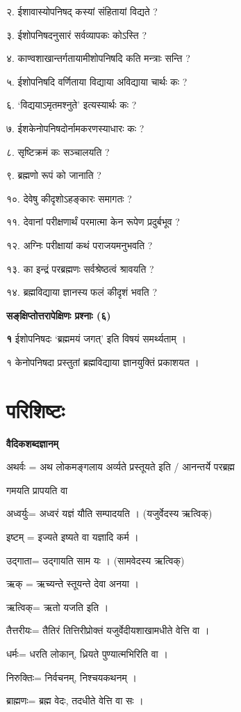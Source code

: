 \documentclass[11pt, a5paper]{article}
\begin{document}
२. ईशावास्योपनिषद् कस्यां संहितायां विद्यते ?

३. ईशोपनिषदनुसारं सर्वव्यापकः कोऽस्ति ?

४. काण्वशाखान्तर्गतायामीशोपनिषदि कति मन्त्राः सन्ति ?

५. ईशोपनिषदि वर्णिताया विद्याया अविद्याया चार्थः कः ?

६. ‘विद्ययाऽमृतमश्नुते’ इत्यस्यार्थः कः ?

७. ईशकेनोपनिषदोर्नामकरणस्याधारः कः ?

८. सृष्टिक्रमं कः सञ्चालयति ?

९.   ब्रह्मणो रूपं को जानाति ?

१०. देवेषु कीदृशोऽहङ्कारः समागतः ?

११. देवानां परीक्षणार्थं परमात्मा केन रूपेण प्रदुर्बभूव ?

१२. अग्निः परीक्षायां कथं पराजयमनुभवति ?

१३. का इन्द्रं परब्रह्मणः सर्वश्रेष्ठत्वं श्रावयति ?

१४. ब्रह्मविद्याया ज्ञानस्य फलं कीदृशं भवति ?

\textbf{सङ्‌क्षिप्तोत्तरापेक्षिणः प्रश्नाः (६)}

\textbf{१} ईशोपनिषदः ‘ब्रह्ममयं जगत्’ इति विषयं समर्थ्यताम् ।

१ केनोपनिषदा प्रस्तुतां ब्रह्मविद्याया ज्ञानयुक्तिं प्रकाशयत ।

\section{\textbf{परिशिष्टः}}

\textbf{वैदिकशब्दज्ञानम्}

अथर्वः = अथ लोकमङ्गलाय अर्व्यते प्रस्तूयते इति / आनन्तर्ये परब्रह्म

गमयति प्रापयति वा

अध्वर्युः= अध्वरं यज्ञं यौति सम्पादयति  । (यजुर्वेदस्य ऋत्विक्)

इष्टम् = इज्यते इष्यते वा यज्ञादि कर्म ।

उद्गाता= उद्गायति साम यः । (सामवेदस्य ऋत्विक्)

ऋक् = ऋच्यन्ते स्तूयन्ते देवा अनया ।

ऋत्विक्= ऋतो यजति इति ।

तैत्तरीयः= तैतिरं तित्तिरीप्रोक्तं यजुर्वेदीयशाखामधीते वेत्ति वा ।

धर्मः= धरति लोकान्, ध्रियते पुण्यात्मभिरिति वा ।

निरुक्तिः= निर्वचनम्, निश्चयकथनम् ।

ब्राह्मणः= ब्रह्म वेदः, तदधीते वेत्ति वा सः ।
\end{document}
